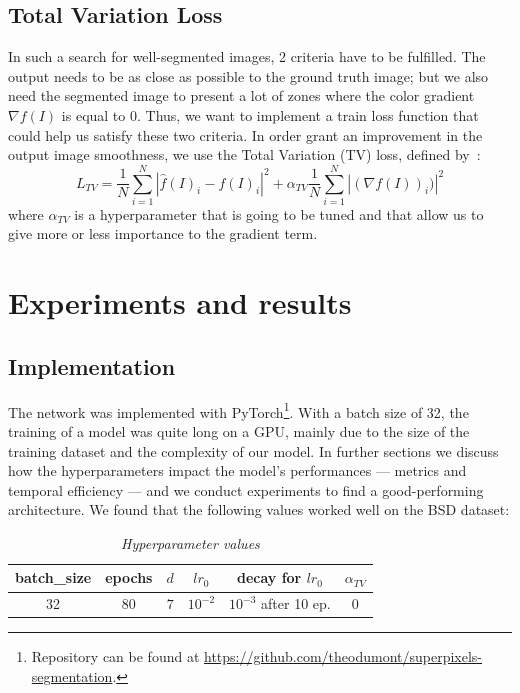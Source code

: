 \documentclass{article}
\begin{document}
    \subsection{Total Variation Loss}
        In such a search for well-segmented images, 2 criteria have to be fulfilled. The output needs to be as close as possible to the ground truth image; but we also need the segmented image to present a lot of zones where the color gradient $\nabla f(I)$ is equal to $0$. Thus, we want to implement a train loss function that could help us satisfy these two criteria.
        In order grant an improvement in the output image smoothness, we use the Total Variation (TV) loss, defined by~\cite{tvloss}:
        $$
        L_{TV}=\frac{1}{N}\sum_{i=1}^N |\hat{f}(I)_i-f(I)_i|^2+\alpha_{TV}\frac{1}{N}\sum_{i=1}^N|(\nabla f(I))_i)|^2
        $$
        where $\alpha_{TV}$ is a hyperparameter that is going to be tuned and that allow us to give more or less importance to the gradient term.

\section{Experiments and results}
    \subsection{Implementation}
    The network was implemented with PyTorch\footnote{Repository can be found at \url{https://github.com/theodumont/superpixels-segmentation}.}. With a batch size of 32, the training of a model was quite long on a GPU, mainly due to the size of the training dataset and the complexity of our model. In further sections we discuss how the hyperparameters impact the model's performances --- metrics and temporal efficiency --- and we conduct experiments to find a good-performing architecture. We found that the following values worked well on the BSD dataset:
    \begin{table}[!ht]
        \centering
        \begin{tabular}{|c|c|c|c|c|c|}
            \hline
            batch\_size & epochs & $d$ & $lr_0$ & decay for $lr_0$ & $\alpha_{TV}$ \\
            \hline
            \hline
            32 & 80 & $7$ & $10^{-2}$ & $10^{-3}$ after 10 ep. & 0 \\
            \hline
        \end{tabular}
        \caption{\textit{Hyperparameter values}}
    \end{table}
\end{document}
